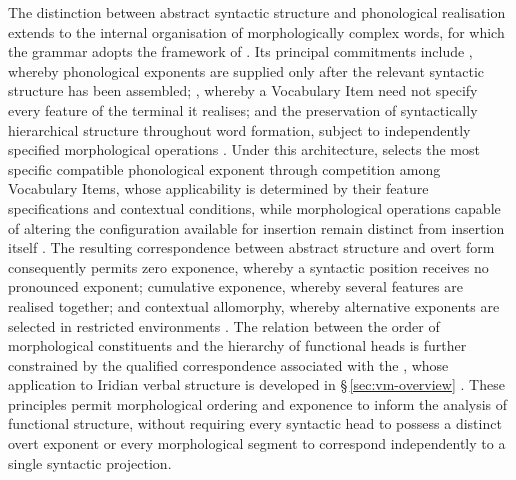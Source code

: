 The distinction between abstract syntactic structure and phonological
realisation extends to the internal organisation of morphologically complex
words, for which the grammar adopts the framework of  \cite{hallemarantz1993}. Its principal commitments include
, whereby phonological exponents are supplied only
after the relevant syntactic structure has been assembled;
, whereby a Vocabulary Item need not specify every
feature of the terminal it realises; and the preservation of syntactically
hierarchical structure throughout word formation, subject to independently
specified morphological operations \cite[pp.~275--276]{hallemarantz1994}.
Under this architecture,  selects the most
specific compatible phonological exponent through competition among
Vocabulary Items, whose applicability is determined by their feature
specifications and contextual conditions, while morphological operations
capable of altering the configuration available for insertion remain
distinct from insertion itself \cite{embicknoyer2007}. The resulting
correspondence between abstract structure and overt form consequently
permits zero exponence, whereby a syntactic position receives no pronounced
exponent; cumulative exponence, whereby several features are realised
together; and contextual allomorphy, whereby alternative exponents are
selected in restricted environments \cite{embicknoyer2007,embick2010}. The
relation between the order of morphological constituents and the hierarchy
of functional heads is further constrained by the qualified correspondence
associated with the , whose application to Iridian
verbal structure is developed in §\,\ref{sec:vm-overview}
\cite{baker1985,harley2013b}. These principles permit morphological ordering
and exponence to inform the analysis of functional structure, without
requiring every syntactic head to possess a distinct overt exponent or every
morphological segment to correspond independently to a single syntactic
projection.

